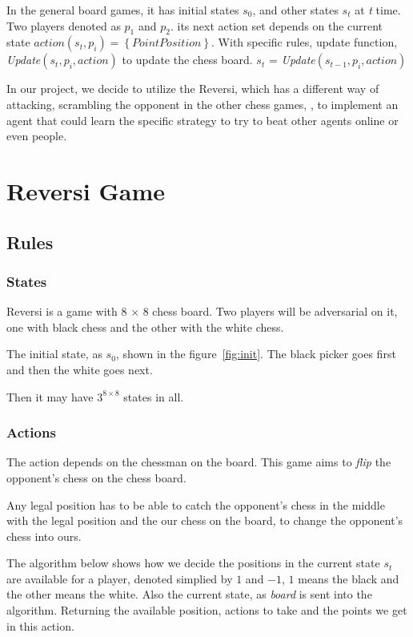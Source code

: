 \documentclass[10pt,twocolumn,letterpaper]{article}
\begin{document}
In the general board games, it has initial states 
$s_{0}$, and other states $s_{t}$ at \emph{t} time. Two players denoted as 
$p_{1}$ and $p_{2}$. its next action set depends on the current 
state $action\left(s_{t}, p_{i}\right) = \left\{PointPosition\right\}$. 
With specific rules, update function, \emph{Update}$\left(s_{t}, p_{i}, action \right)$ to update the chess board. 
$s_{t}$ = \emph{Update}$\left(s_{t-1}, p_{i}, action \right)$


In our project, we decide to utilize the Reversi, which 
has a different way of attacking, scrambling the opponent in the other chess games, 
 , to implement an agent that could learn the 
specific strategy to try to beat other agents online 
or even people. 



\section{Reversi Game}
\subsection{Rules}
\subsubsection{States}
\quad Reversi is a game with 8 $\times$ 8 chess board. Two players 
will be adversarial on it, one with black chess 
and the other with the white chess. 

The initial state, as $s_{0}$, shown in the figure~\ref{fig:init}.
The black picker goes first and then the white goes 
next. 

Then it may have $3^{8\times8}$ states in all. 

\subsubsection{Actions}
\quad The action depends on the chessman on the board. 
This game aims to \emph{flip} the opponent's chess 
on the chess board. 

Any legal position has to be able to catch the opponent's 
chess in the middle with the legal position and the our chess 
on the board, to change the opponent's chess into ours.



The algorithm below shows how we decide the positions 
in the current state $s_t$ are available for a player, 
denoted simplied by $1$ and $-1$, $1$ means the black and 
the other means the white. Also the current state, as 
\emph{board} is sent into the algorithm. Returning 
the available position, actions to take and the points 
we get in this action. 
\end{document}
